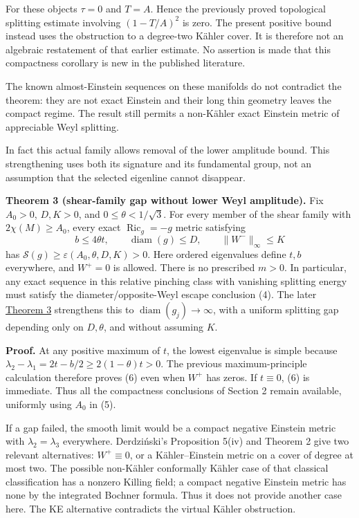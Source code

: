 \documentclass[
  11pt,
]{article}
\begin{document}
For these objects \(\tau=0\) and \(T=A\). Hence the previously proved
topological splitting estimate involving \((1-T/A)^2\) is zero. The
present positive bound instead uses the obstruction to a degree-two
Kähler cover. It is therefore not an algebraic restatement of that
earlier estimate. No assertion is made that this compactness corollary
is new in the published literature.

The known almost-Einstein sequences on these manifolds do not contradict
the theorem: they are not exact Einstein and their long thin geometry
leaves the compact regime. The result still permits a non-Kähler exact
Einstein metric of appreciable Weyl splitting.

In fact this actual family allows removal of the lower amplitude bound.
This strengthening uses both its signature and its fundamental group,
not an assumption that the selected eigenline cannot disappear.

\textbf{Theorem 3 (shear-family gap without lower Weyl amplitude).} Fix
\(A_0>0\), \(D,K>0\), and \(0\le\theta<1/\sqrt3\). For every member of
the shear family with \(2\chi(M)\ge A_0\), every exact
\(\operatorname{Ric}_g=-g\) metric satisfying \[
 b\le4\theta t,\qquad \operatorname{diam}(g)\le D,
 \qquad\|W^-\|_\infty\le K
\] has \(\mathscr S(g)\ge\varepsilon(A_0,\theta,D,K)>0\). Here ordered
eigenvalues define \(t,b\) everywhere, and \(W^+=0\) is allowed. There
is no prescribed \(m>0\). In particular, any exact sequence in this
relative pinching class with vanishing splitting energy must satisfy the
diameter/opposite-Weyl escape conclusion (4). The later
\href{line1_aspherical_no_bubbles.md}{Theorem 3} strengthens this to
\(\operatorname{diam}(g_j)\to\infty\), with a uniform splitting gap
depending only on \(D,\theta\), and without assuming \(K\).

\textbf{Proof.} At any positive maximum of \(t\), the lowest eigenvalue
is simple because \(\lambda_2-\lambda_1=2t-b/2\ge2(1-\theta)t>0\). The
previous maximum-principle calculation therefore proves (6) even when
\(W^+\) has zeros. If \(t\equiv0\), (6) is immediate. Thus all the
compactness conclusions of Section 2 remain available, uniformly using
\(A_0\) in (5).

If a gap failed, the smooth limit would be a compact negative Einstein
metric with \(\lambda_2=\lambda_3\) everywhere. Derdziński's Proposition
5(iv) and Theorem 2 give two relevant alternatives: \(W^+\equiv0\), or a
Kähler--Einstein metric on a cover of degree at most two. The possible
non-Kähler conformally Kähler case of that classical classification has
a nonzero Killing field; a compact negative Einstein metric has none by
the integrated Bochner formula. Thus it does not provide another case
here. The KE alternative contradicts the virtual Kähler obstruction.
\end{document}
